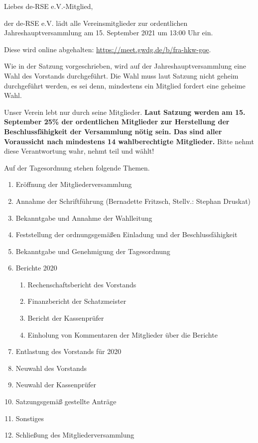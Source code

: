 \documentclass[../Vorlagen/de-RSE_Brief,a4paper]{scrlttr2}
\begin{document}

\begin{letter}{\mbox{}
}
\opening{Liebes de-RSE e.V.-Mitglied,}

der de-RSE e.V. lädt alle Vereinsmitglieder zur ordentlichen Jahreshauptversammlung am 15. September 2021 um 13:00 Uhr ein.

Diese wird online abgehalten: \href{https://meet.gwdg.de/b/fra-hkw-gqe}{https://meet.gwdg.de/b/fra-hkw-gqe}.

Wie in der Satzung vorgeschrieben, wird auf der Jahreshauptversammlung eine Wahl des Vorstands durchgeführt.
Die Wahl muss laut Satzung nicht geheim durchgeführt werden, es sei denn, mindestens ein Mitglied fordert eine geheime Wahl.

Unser Verein lebt nur durch seine Mitglieder.
\textbf{Laut Satzung werden am 15. September 25\% der ordentlichen Mitglieder zur Herstellung der Beschlussfähigkeit der Versammlung nötig sein. Das sind aller Voraussicht nach mindestens 14 wahlberechtigte Mitglieder.}
Bitte nehmt diese Verantwortung wahr, nehmt teil und wählt!

\clearpage
\vspace{2em}
Auf der Tagesordnung stehen folgende Themen.
\begin{enumerate}
\setlength\itemsep{0em}
\item Eröffnung der Mitgliederversammlung
\item Annahme der Schriftführung (Bernadette Fritzsch, Stellv.: Stephan Druskat)
\item Bekanntgabe und Annahme der Wahlleitung
\item Feststellung der ordnungsgemäßen Einladung und der Beschlussfähigkeit
\item Bekanntgabe und Genehmigung der Tagesordnung
\item Berichte 2020
\begin{enumerate}
 \item Rechenschaftsbericht des Vorstands
 \item Finanzbericht der Schatzmeister
 \item Bericht der Kassenprüfer
 \item Einholung von Kommentaren der Mitglieder über die Berichte
\end{enumerate}
\item Entlastung des Vorstands für 2020
\item Neuwahl des Vorstands
\item Neuwahl der Kassenprüfer
\item Satzungsgemäß gestellte Anträge
\item Sonstiges
\item Schließung des Mitgliederversammlung
\end{enumerate}


\end{letter}
\end{document}
